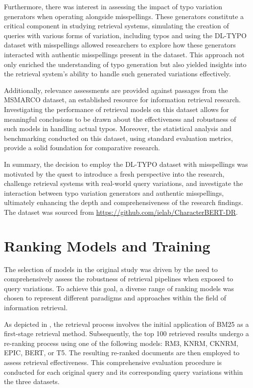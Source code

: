 Furthermore, there was interest in assessing the impact of typo variation generators when operating alongside misspellings. These generators constitute a critical component in studying retrieval systems, simulating the creation of queries with various forms of variation, including typos and using the DL-TYPO dataset with misspellings allowed researchers to explore how these generators interacted with authentic misspellings present in the dataset. This approach not only enriched the understanding of typo generation but also yielded insights into the retrieval system's ability to handle such generated variations effectively.



Additionally, relevance assessments are provided against passages from the MSMARCO dataset, an established resource for information retrieval research. Investigating the performance of retrieval models on this dataset allows for meaningful conclusions to be drawn about the effectiveness and robustness of such models in handling actual typos. Moreover, the statistical analysis and benchmarking conducted on this dataset, using standard evaluation metrics, provide a solid foundation for comparative research. 

In summary, the decision to employ the DL-TYPO dataset with misspellings was motivated by the quest to introduce a fresh perspective into the research, challenge retrieval systems with real-world query variations, and investigate the interaction between typo variation generators and authentic misspellings, ultimately enhancing the depth and comprehensiveness of the research findings. The dataset was sourced from \url{https://github.com/ielab/CharacterBERT-DR}.

\section{Ranking Models and Training}
The selection of models in the original study was driven by the need to comprehensively assess the robustness of retrieval pipelines when exposed to query variations. To achieve this goal, a diverse range of ranking models was chosen to represent different paradigms and approaches within the field of information retrieval.

As depicted in , the retrieval process involves the initial application of BM25 as a first-stage retrieval method. Subsequently, the top 100 retrieved results undergo a re-ranking process using one of the following models: RM3, KNRM, CKNRM, EPIC, BERT, or T5. The resulting re-ranked documents are then employed to assess retrieval effectiveness. This comprehensive evaluation procedure is conducted for each original query and its corresponding query variations within the three datasets.

